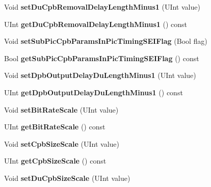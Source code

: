 \begin{DoxyCompactItemize}
Void {\bfseries set\+Du\+Cpb\+Removal\+Delay\+Length\+Minus1} (U\+Int value)
\item 
\mbox{\label{class_t_com_h_r_d_a3fa3edc5549b14f322706c75a80f8e2b}} 
U\+Int {\bfseries get\+Du\+Cpb\+Removal\+Delay\+Length\+Minus1} () const
\item 
\mbox{\label{class_t_com_h_r_d_a21e26e31dbce58b2b281bab88ecdbb29}} 
Void {\bfseries set\+Sub\+Pic\+Cpb\+Params\+In\+Pic\+Timing\+S\+E\+I\+Flag} (Bool flag)
\item 
\mbox{\label{class_t_com_h_r_d_afdf6d7170220ec04e1c97ad0c7edf9ba}} 
Bool {\bfseries get\+Sub\+Pic\+Cpb\+Params\+In\+Pic\+Timing\+S\+E\+I\+Flag} () const
\item 
\mbox{\label{class_t_com_h_r_d_a6a7e2c023fc4ef4c857844d78cffc947}} 
Void {\bfseries set\+Dpb\+Output\+Delay\+Du\+Length\+Minus1} (U\+Int value)
\item 
\mbox{\label{class_t_com_h_r_d_aaac2072824d4fff214b065806eb07dbf}} 
U\+Int {\bfseries get\+Dpb\+Output\+Delay\+Du\+Length\+Minus1} () const
\item 
\mbox{\label{class_t_com_h_r_d_a98ff1d4e8a5dc6cc1579b0c3514b1c51}} 
Void {\bfseries set\+Bit\+Rate\+Scale} (U\+Int value)
\item 
\mbox{\label{class_t_com_h_r_d_a22f71add6f240230f20a7dfa4d16a890}} 
U\+Int {\bfseries get\+Bit\+Rate\+Scale} () const
\item 
\mbox{\label{class_t_com_h_r_d_a1b95e4f0d4ab4ef7b9a7a0dade39ca80}} 
Void {\bfseries set\+Cpb\+Size\+Scale} (U\+Int value)
\item 
\mbox{\label{class_t_com_h_r_d_ad972d9bc8546411330ba27bad761f916}} 
U\+Int {\bfseries get\+Cpb\+Size\+Scale} () const
\item 
\mbox{\label{class_t_com_h_r_d_aa93727c211ec67f6e6f1710e3f18f3fe}} 
Void {\bfseries set\+Du\+Cpb\+Size\+Scale} (U\+Int value)
\item 
\mbox{\label{class_t_com_h_r_d_a0dc6ce12ac7765febed446bae3b8582c}} 

\end{DoxyCompactItemize}
